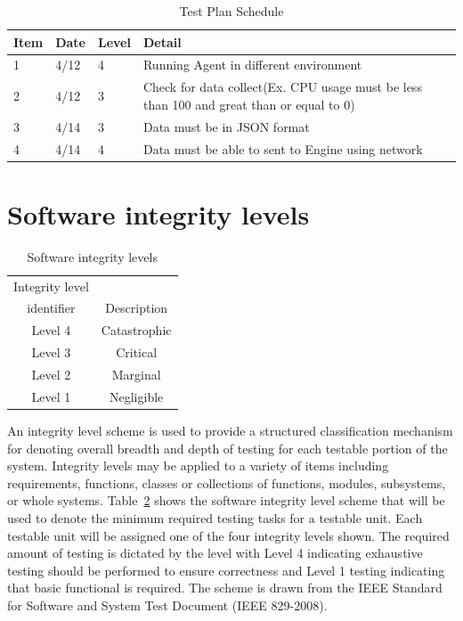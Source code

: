 \documentclass[letterpaper,12pt,oneside,listof=totoc]{scrreprt}
\begin{document}
\begin {table}[h!]
\begin{tabular}{|p{} | p{}|p{}| p{ }|}
\hline
\textbf {Item} & \textbf{Date} &\textbf{Level} &\textbf{Detail}\\
    \hline
    1 & 4/12 & 4 & Running Agent in different environment \\
    \hline
    2 & 4/12 & 3 & Check for data collect(Ex. CPU usage must be less than 100 and great than or equal to 0) \\
    \hline
    3 & 4/14 & 3 & Data must be in JSON format \\
    \hline
    4 & 4/14 & 4 & Data must be able to sent to Engine using network \\
    \hline
    \end{tabular}
    \caption{Test Plan Schedule}
    \label{Schedule}
\end {table}

\section{Software integrity levels}

\begin{table}
\centering

\begin{tabular}{|c|c|}
\hline
Integrity level & \\
identifier      & Description \\
\hline
Level 4         & Catastrophic \\
Level 3         & Critical \\
Level 2         & Marginal \\
Level 1         & Negligible \\
\hline
\end{tabular}
\label{sils}
\caption{Software integrity levels}
\end{table}

An integrity level scheme is used to provide a structured classification mechanism for denoting overall breadth and depth of testing for each testable portion of the system. Integrity levels may be applied to a variety of items including requirements, functions, classes or collections of functions, modules, subsystems, or whole systems. Table~\ref{sils} shows the software integrity level scheme that will be used to denote the minimum required testing tasks for a testable unit. Each testable unit will be assigned one of the four integrity levels shown. The required amount of testing is dictated by the level with Level 4 indicating exhaustive testing should be performed to ensure correctness and Level 1 testing indicating that basic functional is required. The scheme is drawn from the IEEE Standard for Software and System Test Document (IEEE 829-2008).
\end{document}
